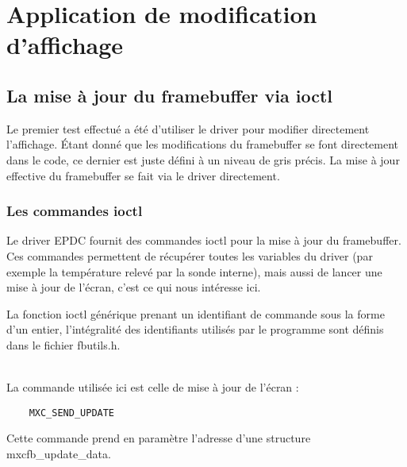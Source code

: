 %

\newpage

\section{Application de modification d'affichage} %


\subsection{La mise à jour du framebuffer via ioctl}

Le premier test effectué a été d'utiliser le driver pour modifier directement l'affichage.
Étant donné que les modifications du framebuffer se font directement dans le code, ce dernier est juste défini à un niveau de gris précis. La mise à jour effective du framebuffer se fait via le driver directement.

\subsubsection{Les commandes ioctl}

Le driver EPDC fournit des commandes ioctl pour la mise à jour du framebuffer. Ces commandes permettent de récupérer toutes les variables du driver (par exemple la température relevé par la sonde interne), mais aussi de lancer une mise à jour de l'écran, c'est ce qui nous intéresse ici.

La fonction ioctl générique prenant un identifiant de commande sous la forme d'un entier, l'intégralité des identifiants utilisés par le programme sont définis dans le fichier fbutils.h. %

~\\
La commande utilisée ici est celle de mise à jour de l'écran : 
\begin{lstlisting}
	MXC_SEND_UPDATE
\end{lstlisting}
Cette commande prend en paramètre l'adresse d'une structure mxcfb_update_data.

